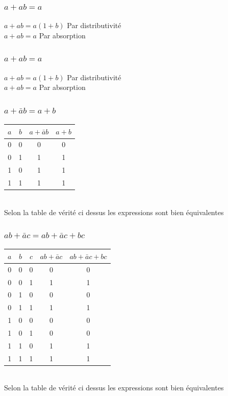 \documentclass[10pt,a4paper]{article}
\begin{document}
\subsubsection{$a+ab=a$}
\begin{flushleft}
$a+ab = a(1+b)$ Par distributivité\\
$a+ab = a$ Par absorption
\end{flushleft}

\subsubsection{$a+ab=a$}
\begin{flushleft}
$a+ab = a(1+b)$ Par distributivité\\
$a+ab = a$ Par absorption
\end{flushleft}

\subsubsection{$a+\bar{a}b = a+b$}
\begin{tabular}{cc|cc}
$a$ & $b$ & $a+\bar{a}b$ & $a+b$ \\ 
\hline 
0 & 0 & 0 & 0\\ 
0 & 1 & 1 & 1 \\ 
1 & 0 & 1 & 1  \\ 
1 & 1 & 1 & 1   \\ 
\end{tabular} \\
Selon la table de vérité ci dessus les expressions sont bien équivalentes

\subsubsection{$ab+\bar{a}c = ab+\bar{a}c+bc$}
\begin{tabular}{ccc|cc}
$a$ & $b$ & $c$ & $ab+\bar{a}c$ & $ab+\bar{a}c+bc$ \\ 
\hline 
0 & 0 & 0 & 0 & 0\\ 
0 & 0 & 1 & 1 & 1 \\ 
0 & 1 & 0 & 0 & 0  \\ 
0 & 1 & 1 & 1 & 1  \\ 
1 & 0 & 0 & 0 & 0\\ 
1 & 0 & 1 & 0 & 0\\ 
1 & 1 & 0 & 1 & 1 \\ 
1 & 1 & 1 & 1 & 1  \\ 
\end{tabular} \\
Selon la table de vérité ci dessus les expressions sont bien équivalentes
\end{document}
